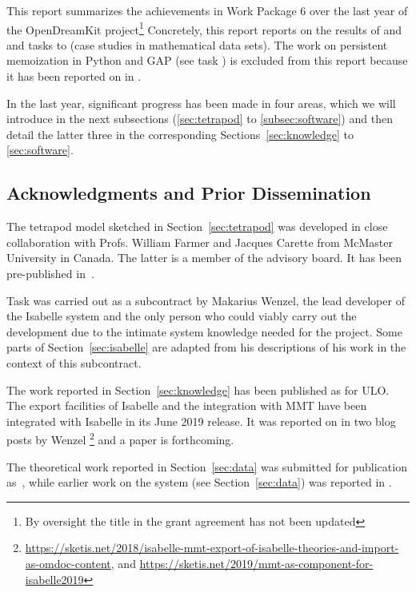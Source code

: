 This report summarizes the achievements in Work Package 6 over the last year of the OpenDreamKit project\footnote{By oversight the title in the grant agreement has not been updated} Concretely, this report reports on the results of  and  and tasks  to  (case studies in mathematical data sets). The work on persistent memoization in Python and GAP (see task ) is excluded from this report because it has been reported on in .

In the last year, significant progress has been made in four areas, which we will introduce in the next subsections (\ref{sec:tetrapod} to \ref{subsec:software}) and then detail the latter three in the corresponding Sections~\ref{sec:knowledge} to \ref{sec:software}.






\subsection{Acknowledgments and Prior Dissemination}
The tetrapod model sketched in Section~\ref{sec:tetrapod} was developed in close collaboration with Profs. William Farmer and Jacques Carette from McMaster University in Canada.
The latter is a member of the \pn advisory board. It has been pre-published in~\cite{CarFarKohRab:bmobb19}.

Task  was carried out as a subcontract by Makarius Wenzel, the lead developer of the Isabelle system and the only person who could viably carry out the development due to the intimate system knowledge needed for the project.
Some parts of Section~\ref{sec:isabelle} are adapted from his descriptions of his work in the context of this subcontract.

The work reported in Section~\ref{sec:knowledge} has been published as \cite{ConKohMue:rdaml19} for ULO.
The export facilities of Isabelle and the integration with MMT have been integrated with Isabelle in its June 2019 release.
It was reported on in two blog posts by Wenzel%
\footnote{\url{https://sketis.net/2018/isabelle-mmt-export-of-isabelle-theories-and-import-as-omdoc-content}, and \url{https://sketis.net/2019/mmt-as-component-for-isabelle2019}}
and a paper is forthcoming.

The theoretical work reported in Section~\ref{sec:data} was submitted for publication as~\cite{CarFarKohRab:bmobb19}, while earlier work on the \dmh system (see Section~\ref{sec:data}) was reported in \cite{BerKohRab:tumdi19}.

